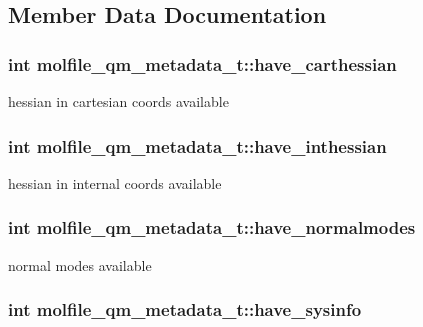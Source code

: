 \subsection{\-Member \-Data \-Documentation}
\hypertarget{structmolfile__qm__metadata__t_afe95e4ff9a634e0dd0331b74e6f764a1}{
\subsubsection[{have\-\_\-carthessian}]{\setlength{\rightskip}{0pt plus 5cm}int {\bf molfile\-\_\-qm\-\_\-metadata\-\_\-t\-::have\-\_\-carthessian}}}\label{structmolfile__qm__metadata__t_afe95e4ff9a634e0dd0331b74e6f764a1}
hessian in cartesian coords available \hypertarget{structmolfile__qm__metadata__t_a5dc0455066f4919cbc87e482518cd517}{
\subsubsection[{have\-\_\-inthessian}]{\setlength{\rightskip}{0pt plus 5cm}int {\bf molfile\-\_\-qm\-\_\-metadata\-\_\-t\-::have\-\_\-inthessian}}}\label{structmolfile__qm__metadata__t_a5dc0455066f4919cbc87e482518cd517}
hessian in internal coords available \hypertarget{structmolfile__qm__metadata__t_acb40de5af1f93f949cbf3b6b0448f2e1}{
\subsubsection[{have\-\_\-normalmodes}]{\setlength{\rightskip}{0pt plus 5cm}int {\bf molfile\-\_\-qm\-\_\-metadata\-\_\-t\-::have\-\_\-normalmodes}}}\label{structmolfile__qm__metadata__t_acb40de5af1f93f949cbf3b6b0448f2e1}
normal modes available \hypertarget{structmolfile__qm__metadata__t_a375fd311a7a873cb35a6d885a2467b41}{
\subsubsection[{have\-\_\-sysinfo}]{\setlength{\rightskip}{0pt plus 5cm}int {\bf molfile\-\_\-qm\-\_\-metadata\-\_\-t\-::have\-\_\-sysinfo}}}\label{structmolfile__qm__metadata__t_a375fd311a7a873cb35a6d885a2467b41}
